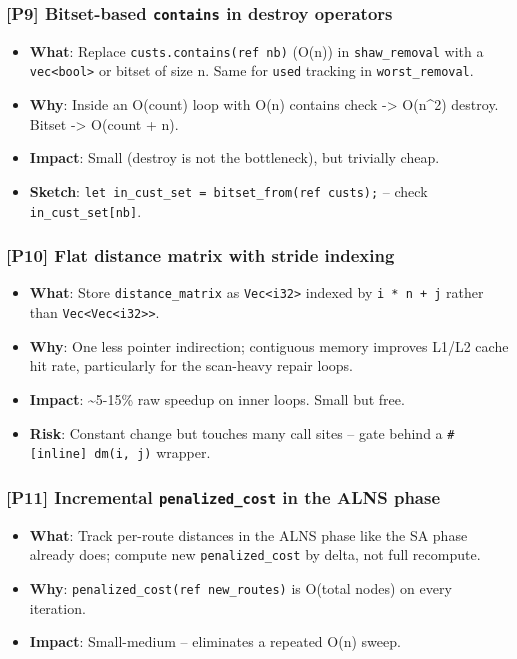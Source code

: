 \documentclass[twocolumn,10pt,letterpaper]{article}
\begin{document}
\subsubsection{[P9] Bitset-based \texttt{contains} in destroy operators}
\begin{itemize}
\setlength{\itemsep}{0pt}
\setlength{\parskip}{0pt}
  \item \textbf{What}: Replace \texttt{custs.contains(ref nb)} (O(n)) in \texttt{shaw\_removal} with a \texttt{vec<bool>} or bitset of size n. Same for \texttt{used} tracking in \texttt{worst\_removal}.
  \item \textbf{Why}: Inside an O(count) loop with O(n) contains check -> O(n\^{}2) destroy. Bitset -> O(count + n).
  \item \textbf{Impact}: Small (destroy is not the bottleneck), but trivially cheap.
  \item \textbf{Sketch}: \texttt{let in\_cust\_set = bitset\_from(ref custs);} -- check \texttt{in\_cust\_set[nb]}.
\end{itemize}

\subsubsection{[P10] Flat distance matrix with stride indexing}
\begin{itemize}
\setlength{\itemsep}{0pt}
\setlength{\parskip}{0pt}
  \item \textbf{What}: Store \texttt{distance\_matrix} as \texttt{Vec<i32>} indexed by \texttt{i * n + j} rather than \texttt{Vec<Vec<i32>>}.
  \item \textbf{Why}: One less pointer indirection; contiguous memory improves L1/L2 cache hit rate, particularly for the scan-heavy repair loops.
  \item \textbf{Impact}: \textasciitilde{}5-15\% raw speedup on inner loops. Small but free.
  \item \textbf{Risk}: Constant change but touches many call sites -- gate behind a \texttt{#[inline] dm(i, j)} wrapper.
\end{itemize}

\subsubsection{[P11] Incremental \texttt{penalized\_cost} in the ALNS phase}
\begin{itemize}
\setlength{\itemsep}{0pt}
\setlength{\parskip}{0pt}
  \item \textbf{What}: Track per-route distances in the ALNS phase like the SA phase already does; compute new \texttt{penalized\_cost} by delta, not full recompute.
  \item \textbf{Why}: \texttt{penalized\_cost(ref new\_routes)} is O(total nodes) on every iteration.
  \item \textbf{Impact}: Small-medium -- eliminates a repeated O(n) sweep.
\end{itemize}
\end{document}
